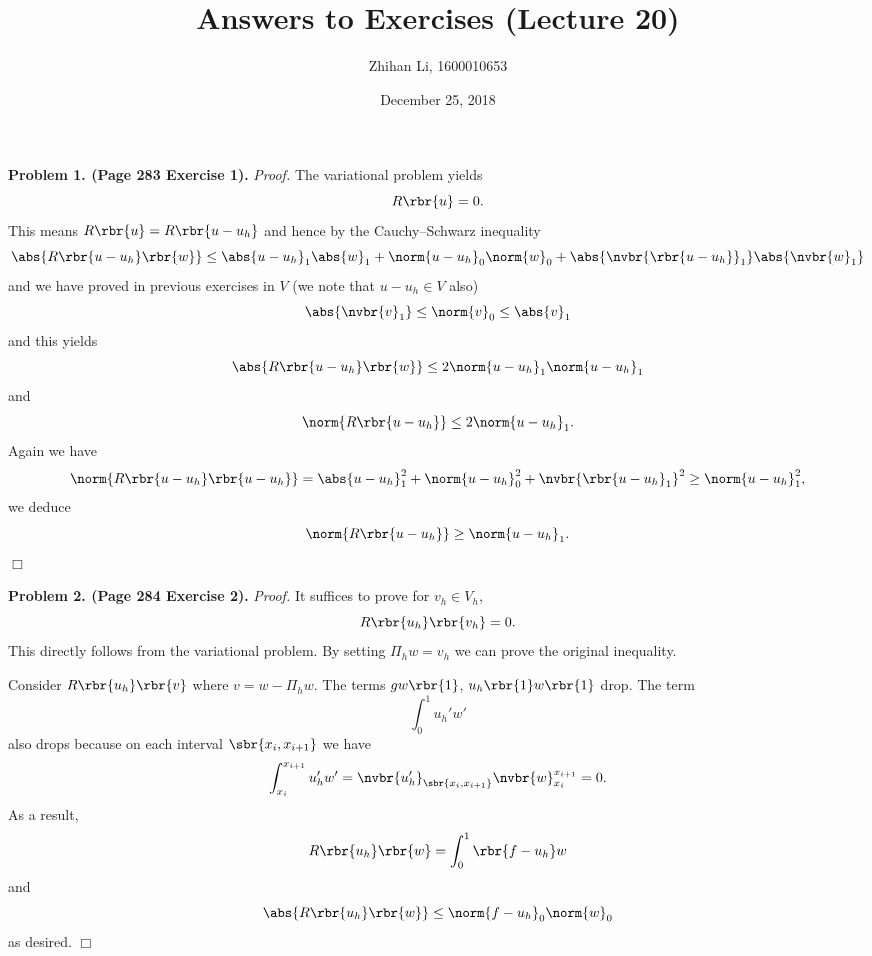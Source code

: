 \documentclass[english, nochinese]{pnote}
\title{Answers to Exercises (Lecture 20)}
\author{Zhihan Li, 1600010653}
\date{December 25, 2018}
\begin{document}
\maketitle

\textbf{Problem 1. (Page 283 Exercise 1).} \textit{Proof.} The variational problem yields
\begin{equation}
R \rbr{u} = 0.
\end{equation}
This means $ R \rbr{u} = R \rbr{ u - u_h } $
and hence by the Cauchy--Schwarz inequality
\begin{equation}
\abs{ R \rbr{ u - u_h } \rbr{w} } \le \abs{ u - u_h }_1 \abs{w}_1 + \norm{ u - u_h }_0 \norm{w}_0 + \abs{\nvbr{\rbr{ u - u_h }}_1} \abs{\nvbr{w}_1}
\end{equation}
and we have proved in previous exercises in $V$ (we note that $ u - u_h \in V $ also)
\begin{equation}
\abs{\nvbr{v}_1} \le \norm{v}_0 \le \abs{v}_1
\end{equation}
and this yields
\begin{equation}
\abs{ R \rbr{ u - u_h } \rbr{w} } \le 2 \norm{ u - u_h }_1 \norm{ u - u_h }_1
\end{equation}
and
\begin{equation}
\norm{ R \rbr{ u - u_h } } \le 2 \norm{ u - u_h }_1.
\end{equation}
Again we have
\begin{equation}
\norm{ R \rbr{ u - u_h } \rbr{ u - u_h } } = \abs{ u - u_h }_1^2 + \norm{ u - u_h }_0^2 + \nvbr{\rbr{ u - u_h }_1}^2 \ge \norm{ u - u_h }_1^2,
\end{equation}
we deduce
\begin{equation}
\norm{ R \rbr{ u - u_h } } \ge \norm{ u - u_h }_1.
\end{equation}
\hfill$\Box$

\textbf{Problem 2. (Page 284 Exercise 2).} \textit{Proof.} It suffices to prove for $ v_h \in V_h $,
\begin{equation}
R \rbr{u_h} \rbr{v_h} = 0.
\end{equation}
This directly follows from the variational problem. By setting $ \Pi_h w = v_h $ we can prove the original inequality.

Consider $ R \rbr{u_h} \rbr{v} $ where $ v = w - \Pi_h w $. The terms $ g w \rbr{1} $, $ u_h \rbr{1} w \rbr{1} $ drop. The term
\begin{equation}
\int_0^1 u_h' w'
\end{equation}
also drops because on each interval $ \sbr{ x_i, x_{ i + 1 } } $ we have
\begin{equation}
\int_{x_i}^{x_{ i + 1 }} u_h' w' = \nvbr{u_h'}_{\sbr{ x_i, x_{ i + 1 }}} \nvbr{w}_{x_i}^{x_{ i + 1 }} = 0.
\end{equation}
As a result,
\begin{equation}
R \rbr{u_h} \rbr{w} = \int_0^1 \rbr{ f - u_h } w
\end{equation}
and
\begin{equation}
\abs{ R \rbr{u_h} \rbr{w} } \le \norm{ f - u_h }_0 \norm{w}_0
\end{equation}
as desired.
\hfill$\Box$
\end{document}
